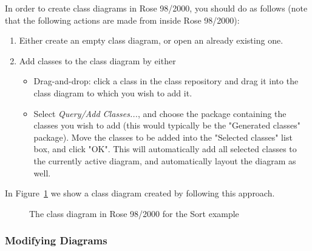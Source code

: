 \documentclass[\pformat,12pt]{article}
\newcommand{\rose}{Rose 98/2000}
\begin{document}
In order to create class diagrams in \rose{}, you should do as follows (note that   
the following actions are made from inside \rose{}):

\begin{enumerate}  
\item Either create an empty class diagram, or open an already existing one.  
\item Add classes to the class diagram by either 
\begin{itemize} 
\item Drag-and-drop: click a class in the class repository and drag it into the class   
diagram to which you wish to add it.  
\item Select {\it Query/Add Classes...}, and choose the package containing the classes   
you wish to add (this would typically be the "Generated classes" package).   
Move the classes to be added into the "Selected classes" list box, and click   
"OK". This will automatically add all selected classes to the currently active   
diagram, and automatically layout the diagram as well.  
\end{itemize}
\end{enumerate}

In Figure~\ref{fig:classdiagram} we show a class diagram created by following this approach.  

\begin{figure}[htb]
\begin{center}
\mbox{}
\caption{The class diagram in \rose{} for the Sort example\label{fig:classdiagram}}
\end{center}
\end{figure}

\subsubsection*{Modifying Diagrams}
\end{document}
